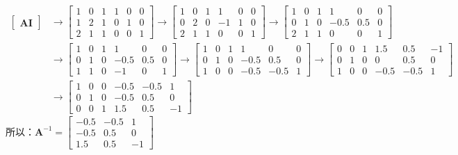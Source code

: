 \documentclass[11pt]{article}
\begin{document}
{\(\begin{aligned} \begin{bmatrix}\mathbf{A} \mathbf{I}\end{bmatrix} & \rightarrow \begin{bmatrix} 1 & 0 & 1 & 1 & 0 & 0 \\ 1 & 2 & 1 & 0 & 1 & 0 \\ 2 & 1 & 1 & 0 & 0 & 1 \end{bmatrix} \rightarrow \begin{bmatrix} 1 & 0 & 1 & 1 & 0 & 0 \\ 0 & 2 & 0 & -1 & 1 & 0 \\ 2 & 1 & 1 & 0 & 0 & 1 \end{bmatrix} \rightarrow \begin{bmatrix} 1 & 0 & 1 & 1 & 0 & 0 \\ 0 & 1 & 0 & -0.5 & 0.5 & 0 \\ 2 & 1 & 1 & 0 & 0 & 1 \end{bmatrix}\\ & \rightarrow \begin{bmatrix} 1 & 0 & 1 & 1 & 0 & 0 \\ 0 & 1 & 0 & -0.5 & 0.5 & 0 \\ 1 & 1 & 0 & -1 & 0 & 1 \end{bmatrix} \rightarrow \begin{bmatrix} 1 & 0 & 1 & 1 & 0 & 0 \\ 0 & 1 & 0 & -0.5 & 0.5 & 0 \\ 1 & 0 & 0 & -0.5 & -0.5 & 1 \end{bmatrix} \rightarrow \begin{bmatrix} 0 & 0 & 1 & 1.5 & 0.5 & -1 \\ 0 & 1 & 0 & 0 & 0.5 & 0 \\ 1 & 0 & 0 & -0.5 & -0.5 & 1 \end{bmatrix}\\ &\rightarrow \begin{bmatrix} 1 & 0 & 0 & -0.5 & -0.5 & 1 \\ 0 & 1 & 0 & -0.5 & 0.5 & 0 \\ 0 & 0 & 1 & 1.5 & 0.5 & -1 \end{bmatrix} \end{aligned}\)
所以：\(\mathbf{A}^{-1}=\begin{bmatrix}-0.5 & -0.5 & 1 \\ -0.5 & 0.5 & 0 \\ 1.5 & 0.5 & -1\end{bmatrix}\)

}
\end{document}
